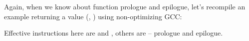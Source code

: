 
Again, when we know about function prologue and epilogue, let's recompile an example returning a value
(, ) using non-optimizing GCC:



Effective instructions here are  and , others are -- prologue and epilogue.

